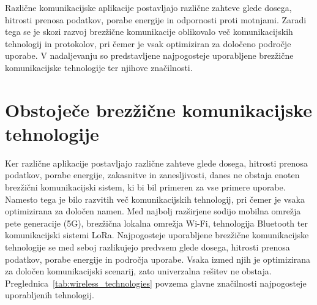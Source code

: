 \documentclass[a4paper, 12pt, openany]{book}
\begin{document}
Različne komunikacijske aplikacije postavljajo različne zahteve glede dosega, hitrosti prenosa podatkov, porabe energije in odpornosti proti motnjami. Zaradi tega se je skozi razvoj brezžične komunikacije oblikovalo več komunikacijskih tehnologij in protokolov, pri čemer je vsak optimiziran za določeno področje uporabe. V nadaljevanju so predstavljene najpogosteje uporabljene brezžične komunikacijske tehnologije ter njihove značilnosti.

\section{Obstoječe brezžične komunikacijske tehnologije}

Ker različne aplikacije postavljajo različne zahteve glede dosega, hitrosti prenosa podatkov, porabe energije, zakasnitve in zanesljivosti, danes ne obstaja enoten brezžični komunikacijski sistem, ki bi bil primeren za vse primere uporabe. Namesto tega je bilo razvitih več komunikacijskih tehnologij, pri čemer je vsaka optimizirana za določen namen. Med najbolj razširjene sodijo mobilna omrežja pete generacije (5G), brezžična lokalna omrežja Wi-Fi, tehnologija Bluetooth ter komunikacijski sistemi LoRa. Najpogosteje uporabljene brezžične komunikacijske tehnologije se med seboj razlikujejo predvsem glede dosega, hitrosti prenosa podatkov, porabe energije in področja uporabe. Vsaka izmed njih je optimizirana za določen komunikacijski scenarij, zato univerzalna rešitev ne obstaja. Preglednica~\ref{tab:wireless_technologies} povzema glavne značilnosti najpogosteje uporabljenih tehnologij.
\end{document}
